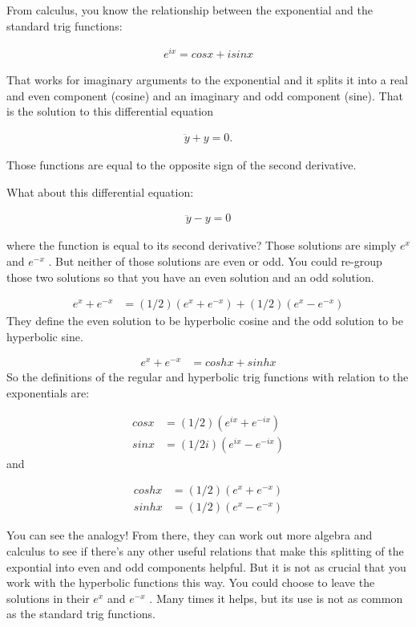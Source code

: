From calculus, you know the relationship between the exponential and the standard trig functions:

\begin{align*}
e^{ix} = cos x + i sin x
\end{align*}

That works for imaginary arguments to the exponential and it splits it into a real and even
component (cosine) and an imaginary and odd component (sine). That is the solution to this
differential equation

\begin{align*}
  \ddot{y} + y = 0.
\end{align*}

Those functions are equal to the opposite sign of the second
derivative.

What about this differential equation:

\begin{align*}
  \ddot{y} - y = 0
\end{align*}

where the function is equal to its second derivative? Those solutions are simply $e^x$ and $e^{-x}$
. But neither of those solutions are even or odd. You could re-group those two solutions so that you
have an even solution and an odd solution.

\begin{align*}
e^x + e^{-x} &= (1/2) (e^x + e^{-x} ) + (1/2) (e^x - e^{-x} )
\end{align*}
They define the even solution to be hyperbolic cosine and the odd solution to be hyperbolic sine.

\begin{align*}
e^x + e^{-x} &= cosh x + sinh x
\end{align*}
So the definitions of the regular and hyperbolic trig functions with relation to the exponentials
are:

\begin{align*}
cos x &= (1/2) ( e^{ix} + e^{-ix} ) \\
sin x &= (1/2i) ( e^{ix} - e^{-ix} )
\end{align*}
and

\begin{align*}
cosh x &= (1/2) ( e^x + e^{-x} ) \\
sinh x &= (1/2) ( e^x - e^{-x} )
\end{align*}

You can see the analogy! From there, they can work out more algebra and calculus to see if there's
any other useful relations that make this splitting of the expontial into even and odd components
helpful. But it is not as crucial that you work with the hyperbolic functions this way. You could
choose to leave the solutions in their $e^{x}$ and $e^{-x}$ . Many times it helps, but its use is
not as common as the standard trig functions.




